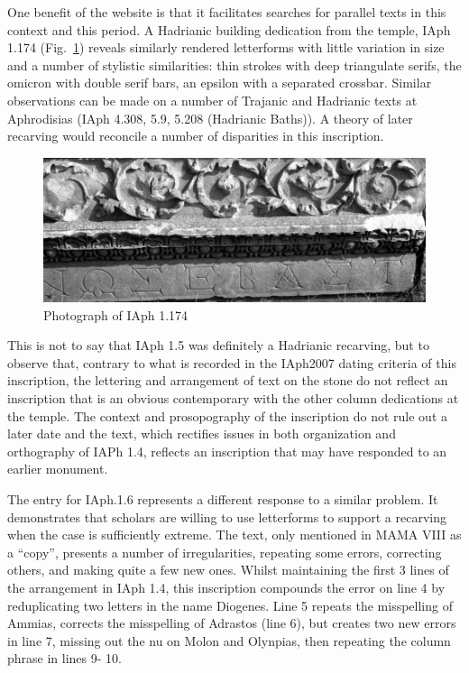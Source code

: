\documentclass[amsthm,ebook]{saparticle}
\begin{document}
One benefit of the website is that it facilitates searches for parallel texts in this context and this period. A
Hadrianic building dedication from the temple, IAph 1.174 (Fig.~\ref{fig:4}) reveals similarly
rendered letterforms with little variation in size and a number of stylistic similarities: thin strokes with deep
triangulate serifs, the omicron with double serif bars, an epsilon with a separated crossbar. Similar observations can
be made on a number of Trajanic and Hadrianic texts at Aphrodisias (IAph 4.308, 5.9, 5.208 (Hadrianic Baths)). A theory
of later recarving would reconcile a number of disparities in this inscription. 







\begin{figure}[!bp]
\centering
 \includegraphics[width=\columnwidth]{PaperproposalforEAGLEfinal-img004.jpg}
\caption{Photograph of IAph 1.174}
\label{fig:4}
\end{figure}





This is not to say that IAph 1.5 was definitely a Hadrianic recarving, but to observe that, contrary to what is recorded
in the IAph2007 dating criteria of this inscription, the lettering and arrangement of text on the stone do not reflect
an inscription that is an obvious contemporary with the other column dedications at the temple. The context and
prosopography of the inscription do not rule out a later date and the text, which rectifies issues in both organization
and orthography of IAPh 1.4, reflects an inscription that may have responded to an earlier monument. 

The entry for IAph.1.6 represents a different response to a similar problem. It demonstrates that scholars are willing
to use letterforms to support a recarving when the case is sufficiently extreme. The text, only mentioned in MAMA VIII
as a ``copy'', presents a number of irregularities, repeating some errors, correcting others, and making quite a few new
ones. Whilst maintaining the first 3 lines of the arrangement in IAph 1.4, this inscription compounds the error on line
4 by reduplicating two letters in the name Diogenes. Line 5 repeats the misspelling of Ammias, corrects the misspelling
of Adrastos (line 6), but creates two new errors in line 7, missing out the nu on Molon and Olynpias, then repeating
the column phrase in lines 9- 10. 
\end{document}
